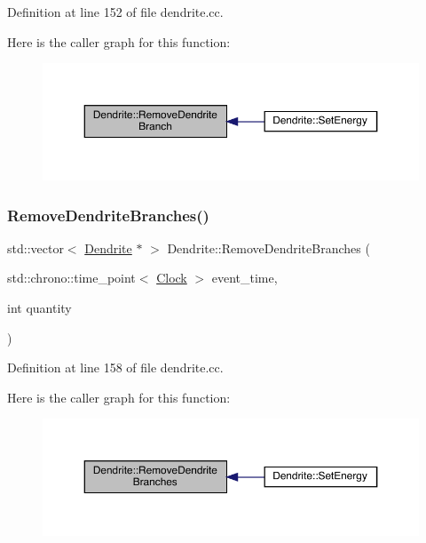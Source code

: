Definition at line 152 of file dendrite.\+cc.

Here is the caller graph for this function\+:
\nopagebreak
\begin{figure}[H]
\begin{center}
\leavevmode
\includegraphics[width=350pt]{class_dendrite_aa23bd0ce7c5a0a9011b28234cc2e90e1_icgraph}
\end{center}
\end{figure}
\mbox{\label{class_dendrite_a15396dce5e1d920fcd1477b9a255dabf}} 
\subsubsection{\texorpdfstring{Remove\+Dendrite\+Branches()}{RemoveDendriteBranches()}}
{\footnotesize\ttfamily std\+::vector$<$ \hyperlink{class_dendrite}{Dendrite} $\ast$ $>$ Dendrite\+::\+Remove\+Dendrite\+Branches (\begin{DoxyParamCaption}\item[{std\+::chrono\+::time\+\_\+point$<$ \hyperlink{universe_8h_a0ef8d951d1ca5ab3cfaf7ab4c7a6fd80}{Clock} $>$}]{event\+\_\+time,  }\item[{int}]{quantity }\end{DoxyParamCaption})}



Definition at line 158 of file dendrite.\+cc.

Here is the caller graph for this function\+:
\nopagebreak
\begin{figure}[H]
\begin{center}
\leavevmode
\includegraphics[width=350pt]{class_dendrite_a15396dce5e1d920fcd1477b9a255dabf_icgraph}
\end{center}
\end{figure}
\mbox{\label{class_dendrite_a6a6290955348051819badb801b753901}} 
